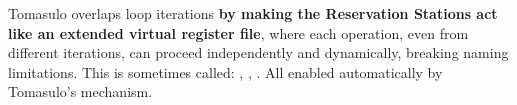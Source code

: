 Tomasulo overlaps loop iterations \textbf{by making the Reservation Stations act like an extended virtual register file}, where each operation, even from different iterations, can proceed independently and dynamically, breaking naming limitations. This is sometimes called: , , . All enabled automatically by Tomasulo's mechanism.